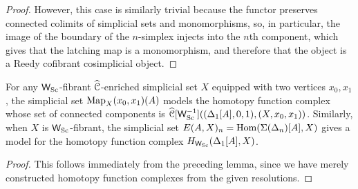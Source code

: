 \begin{proof}
However, this case is similarly trivial because the functor preserves connected colimits of simplicial sets and monomorphisms, so, in particular, the image of the boundary of the \(n\)-simplex injects into the \(n\)th component, which gives that the latching map is a monomorphism, and therefore that the object is a Reedy cofibrant cosimplicial object.  
\end{proof}
\begin{cor}For any \(\mathsf{W}_{{\operatorname{Sc}}}\)-fibrant \(\widehat{\mathcal{C}}\)-enriched simplicial set \(X\) equipped with two vertices \(x_0,x_1\), the simplicial set \(\operatorname{Map}_X(x_0,x_1)(A)\) models the homotopy function complex whose set of connected components is \(\widehat{\mathcal{C}}[\mathsf{W}_{{\operatorname{Sc}}}^{-1}]((\Delta_1[A],0,1),(X,x_0,x_1))\). Similarly, when \(X\) is \(\mathsf{W}_{{\operatorname{Sc}}}\)-fibrant, the simplicial set \(E(A,X)_n={\operatorname{Hom}}(\Sigma(\Delta_n)[A],X)\) gives a model for the homotopy function complex \(H_{\mathsf{W}_{{\operatorname{Sc}}}}(\Delta_1[A],X)\).  
\end{cor}
\begin{proof}This follows immediately from the preceding lemma, since we have merely constructed homotopy function complexes from the given resolutions.  
\end{proof}

